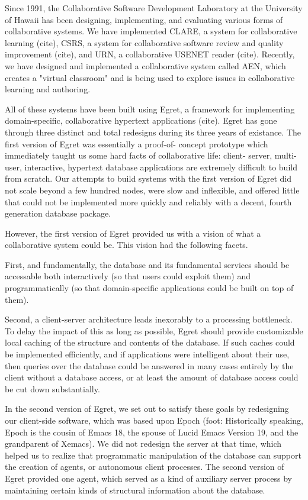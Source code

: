 Since 1991, the Collaborative Software Development Laboratory at the
University of Hawaii has been designing, implementing, and evaluating
various forms of collaborative systems.  We have implemented CLARE, a
system for collaborative learning (cite), CSRS, a system for collaborative
software review and quality improvement (cite), and URN, a collaborative
USENET reader (cite).  Recently, we have designed and implemented a
collaborative system called AEN, which creates a "virtual classroom" and is
being used to explore issues in collaborative learning and authoring.

All of these systems have been built using Egret, a framework for
implementing domain-specific, collaborative hypertext applications (cite).
Egret has gone through three distinct and total redesigns during its three
years of existance.  The first version of Egret was essentially a proof-of-
concept prototype which immediately taught us some hard facts of
collaborative life: client- server, multi-user, interactive, hypertext
database applications are extremely difficult to build from scratch.  Our
attempts to build systems with the first version of Egret did not scale
beyond a few hundred nodes, were slow and inflexible, and offered little
that could not be implemented more quickly and reliably with a decent,
fourth generation database package.

However, the first version of Egret provided us with a vision of what a
collaborative system could be.  This vision had the following facets.

First, and fundamentally, the database and its fundamental services should
be accessable both interactively (so that users could exploit them) and
programmatically (so that domain-specific applications could be built on
top of them).

Second, a client-server architecture leads inexorably to a processing
bottleneck.  To delay the impact of this as long as possible, Egret should
provide customizable local caching of the structure and contents of the
database.  If such caches could be implemented efficiently, and if
applications were intelligent about their use, then queries over the
database could be answered in many cases entirely by the client without a
database access, or at least the amount of database access could be cut
down substantially.

In the second version of Egret, we set out to satisfy these goals by
redesigning our client-side software, which was based upon Epoch (foot:
Historically speaking, Epoch is the cousin of Emacs 18, the spouse of Lucid
Emacs Version 19, and the grandparent of Xemacs).  We did not redesign the
server at that time, which helped us to realize that programmatic
manipulation of the database can support the creation of agents, or
autonomous client processes.  The second version of Egret provided one
agent, which served as a kind of auxiliary server process by maintaining
certain kinds of structural information about the database.

